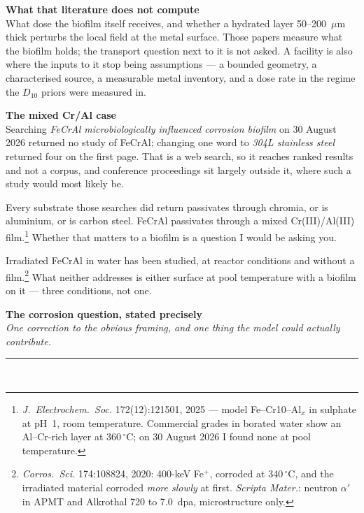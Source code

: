 \documentclass[landscape,12pt]{article}
\newcommand{\pagehead}[2]{%
  {\Large\bfseries #1}\\[1pt]
  {\small\itshape #2}\\[-4pt]
  \rule{\linewidth}{0.6pt}\\[4pt]}
\begin{document}
\begin{minipage}[t]{0.485\linewidth}
{\large\bfseries\color{phys} What that literature does not compute}\\[3pt]
What dose the biofilm itself receives, and whether a hydrated layer 50--200~$\mu$m thick
perturbs the local field at the metal surface. Those papers measure what the biofilm holds; the
transport question next to it is not asked. A facility is also where the inputs to it stop being assumptions --- a bounded geometry, a
characterised source, a measurable metal inventory, and a dose rate in the regime the $D_{10}$
priors were measured in.

\vspace{3mm}
{\large\bfseries\color{prior} The mixed Cr/Al case}\\[3pt]
Searching \emph{FeCrAl microbiologically influenced corrosion biofilm} on 30 August 2026 returned no
study of FeCrAl; changing one word to \emph{304L stainless steel} returned four on the first page.
That is a web search, so it reaches ranked results and not a corpus, and conference proceedings
sit largely outside it, where such a study would most likely be.

\vspace{2mm}
Every substrate those searches did return passivates through chromia, or is aluminium, or is carbon
steel. FeCrAl passivates through a mixed Cr(III)/Al(III) film.\footnote{\textit{J.\ Electrochem.\ Soc.} 172(12):121501, 2025 --- model
Fe--Cr10--Al$_x$ in sulphate at pH~1, room temperature. Commercial grades in borated water show an
Al--Cr-rich layer at 360\,$^\circ$C; on 30 August 2026 I found none at pool temperature.}
Whether that matters to a biofilm is a question I would be asking you.

\vspace{2mm}
Irradiated FeCrAl in water has been studied, at reactor conditions and without a
film.\footnote{\textit{Corros.\ Sci.} 174:108824, 2020: 400-keV Fe$^+$, corroded at
340\,$^\circ$C, and the irradiated material corroded \emph{more slowly} at first. \textit{Scripta
Mater.}: neutron $\alpha'$ in APMT and Alkrothal 720 to 7.0~dpa, microstructure only.} What
neither addresses is either surface at pool temperature with a biofilm on it --- three conditions,
not one.
\end{minipage}

\newpage
\pagehead{The corrosion question, stated precisely}%
{One correction to the obvious framing, and one thing the model could actually contribute.}
\end{document}
